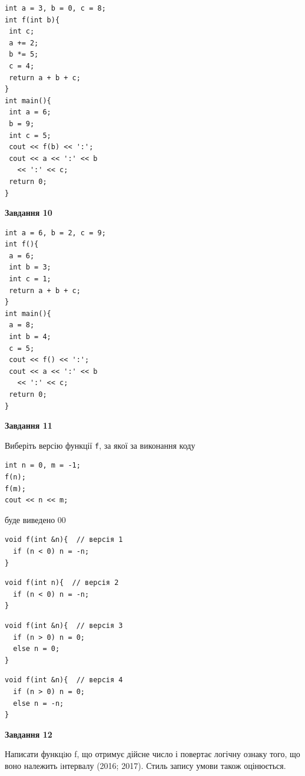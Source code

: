 \documentclass[12pt, ukrainian]{article}
\def\code#1{\Verb!#1!}
\begin{document}
{\begin {large}
\begin{minipage}[t]{7.0cm}
\begin{verbatim}
int a = 3, b = 0, c = 8;
int f(int b){
 int c;
 a += 2;
 b *= 5;
 c = 4;
 return a + b + c;
}
int main(){
 int a = 6;
 b = 9;
 int c = 5;
 cout << f(b) << ':';
 cout << a << ':' << b 
   << ':' << c;
 return 0;
}
\end{verbatim}



\begin{center}
\textbf{Завдання 10}
\end{center}
\vspace{-8mm}

\begin{verbatim}
int a = 6, b = 2, c = 9;
int f(){
 a = 6;
 int b = 3;
 int c = 1;
 return a + b + c;
}
int main(){
 a = 8;
 int b = 4;
 c = 5;
 cout << f() << ':';
 cout << a << ':' << b 
   << ':' << c;
 return 0;
}
\end{verbatim}

\end{minipage}
\vline \hspace{1mm}
\begin{minipage}[t]{11.0cm}

\begin{center}
\textbf{Завдання 11}
\end{center}
Виберіть версію функції \code{f}, за якої за виконання коду
\begin{verbatim}
int n = 0, m = -1;
f(n);
f(m);
cout << n << m;
\end{verbatim}

буде виведено 00

\begin{verbatim}
void f(int &n){  // версія 1
  if (n < 0) n = -n;
}
\end{verbatim}

\vspace{-8mm}\begin{verbatim}
void f(int n){  // версія 2
  if (n < 0) n = -n;
}
\end{verbatim}

\vspace{-8mm}\begin{verbatim}
void f(int &n){  // версія 3
  if (n > 0) n = 0;
  else n = 0;
}
\end{verbatim}

\vspace{-8mm}\begin{verbatim}
void f(int &n){  // версія 4
  if (n > 0) n = 0;
  else n = -n;
}
\end{verbatim}



\begin{center}
\textbf{Завдання 12}
\end{center}

Написати функцiю f, що отримує дійсне число і повертає логічну ознаку того, що воно належить iнтервалу (2016; 2017). Стиль запису умови також оцінюється.\par

\end{minipage}

\end {large}}
\newpage
\end{document}
